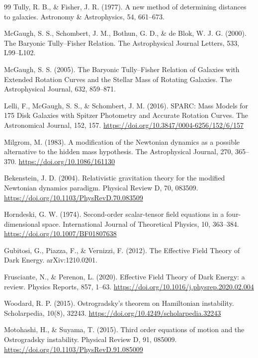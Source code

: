 \begin{thebibliography}{99}
		Tully, R. B., \& Fisher, J. R. (1977). A new method of determining distances to galaxies. Astronomy \& Astrophysics, 54, 661–673.
		
		McGaugh, S. S., Schombert, J. M., Bothun, G. D., \& de Blok, W. J. G. (2000). The Baryonic Tully–Fisher Relation. The Astrophysical Journal Letters, 533, L99–L102.
		
		McGaugh, S. S. (2005). The Baryonic Tully–Fisher Relation of Galaxies with Extended Rotation Curves and the Stellar Mass of Rotating Galaxies. The Astrophysical Journal, 632, 859–871.
		
		Lelli, F., McGaugh, S. S., \& Schombert, J. M. (2016). SPARC: Mass Models for 175 Disk Galaxies with Spitzer Photometry and Accurate Rotation Curves. The Astronomical Journal, 152, 157. \url{https://doi.org/10.3847/0004-6256/152/6/157}
		
		Milgrom, M. (1983). A modification of the Newtonian dynamics as a possible alternative to the hidden mass hypothesis. The Astrophysical Journal, 270, 365–370. \url{https://doi.org/10.1086/161130}
		
		Bekenstein, J. D. (2004). Relativistic gravitation theory for the modified Newtonian dynamics paradigm. Physical Review D, 70, 083509. \url{https://doi.org/10.1103/PhysRevD.70.083509}
		
		Horndeski, G. W. (1974). Second-order scalar-tensor field equations in a four-dimensional space. International Journal of Theoretical Physics, 10, 363–384. \url{https://doi.org/10.1007/BF01807638}
		
		Gubitosi, G., Piazza, F., \& Vernizzi, F. (2012). The Effective Field Theory of Dark Energy. arXiv:1210.0201.
		
		Frusciante, N., \& Perenon, L. (2020). Effective Field Theory of Dark Energy: a review. Physics Reports, 857, 1–63. \url{https://doi.org/10.1016/j.physrep.2020.02.004}
		
		Woodard, R. P. (2015). Ostrogradsky’s theorem on Hamiltonian instability. Scholarpedia, 10(8), 32243. \url{https://doi.org/10.4249/scholarpedia.32243}
		
		Motohashi, H., \& Suyama, T. (2015). Third order equations of motion and the Ostrogradsky instability. Physical Review D, 91, 085009. \url{https://doi.org/10.1103/PhysRevD.91.085009}
		

\end{thebibliography}
